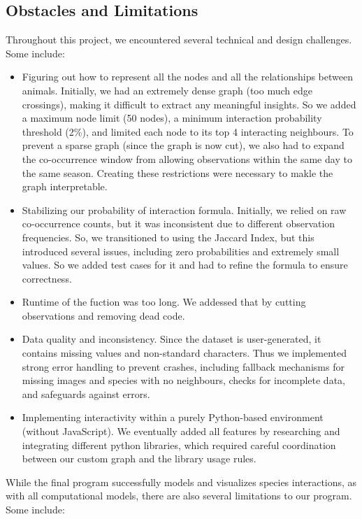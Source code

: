 \documentclass{article}
\begin{document}
\subsection*{Obstacles and Limitations}
Throughout this project, we encountered several technical and design challenges. Some include: 
\begin{itemize}
\item Figuring out how to represent all the nodes and all the relationships between animals. Initially, we had an extremely dense graph (too much edge crossings), making it difficult to extract any meaningful insights. So we added a maximum node limit (50 nodes), a minimum interaction probability threshold (2\%), and limited each node to its top 4 interacting neighbours. To prevent a sparse graph (since the graph is now cut), we also had to expand the co-occurrence window from allowing observations within the same day to the same season. Creating these restrictions were necessary to makle the graph interpretable.
\item Stabilizing our probability of interaction formula. Initially, we relied on raw co-occurrence counts, but it was inconsistent due to different observation frequencies. So, we transitioned to using the Jaccard Index, but this introduced several issues, including zero probabilities and extremely small values. So we added test cases for it and had to refine the formula to ensure correctness.
\item Runtime of the fuction was too long. We addessed that by cutting observations and removing dead code.
\item Data quality and inconsistency. Since the dataset is user-generated, it contains missing values and non-standard characters. Thus we implemented strong error handling to prevent crashes, including fallback mechanisms for missing images and species with no neighbours, checks for incomplete data, and safeguards against errors.
\item Implementing interactivity within a purely Python-based environment (without JavaScript). We eventually added all features by researching and integrating different python libraries, which required careful coordination between our custom graph and the library usage rules. \\ 
\end{itemize}
While the final program successfully models and visualizes species interactions, as with all computational models, there are also several limitations to our program. Some include: 
\end{document}

